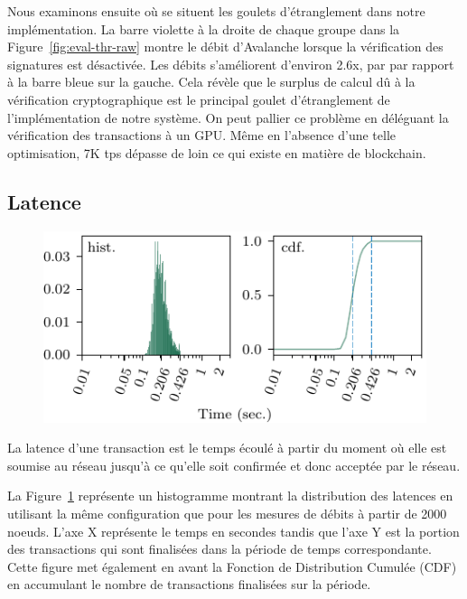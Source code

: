 Nous examinons ensuite où se situent les goulets d'étranglement dans notre implémentation.
La barre violette à la droite de chaque groupe dans la Figure~\ref{fig:eval-thr-raw} montre le débit
d'Avalanche lorsque la vérification des signatures est désactivée. Les débits s'améliorent d'environ 2.6x, par
par rapport à la barre bleue sur la gauche.
Cela révèle que le surplus de calcul dû à la vérification cryptographique est le principal goulet d'étranglement
de l'implémentation de notre système. On peut pallier ce problème en déléguant la vérification des transactions
à un GPU\@. Même en l'absence d'une telle optimisation, 7K tps dépasse de loin ce qui existe en matière de blockchain.

\subsection{Latence}

\begin{figure}
\includegraphics[width=\linewidth]{figures/lat.pdf}
\label{fig:eval-lat1}
\end{figure}

La latence d'une transaction est le temps écoulé à partir du moment où elle est soumise au réseau jusqu'à ce qu'elle
soit confirmée et donc acceptée par le réseau.

La Figure~\ref{fig:eval-lat1} représente un histogramme montrant la distribution des latences en utilisant la
même configuration que pour les mesures de débits à partir de 2000 noeuds. L'axe X représente le temps en secondes
tandis que l'axe Y est la portion des transactions qui sont finalisées dans la période de temps correspondante.
Cette figure met également en avant la Fonction de Distribution Cumulée (CDF) en accumulant le nombre de
transactions finalisées sur la période.

